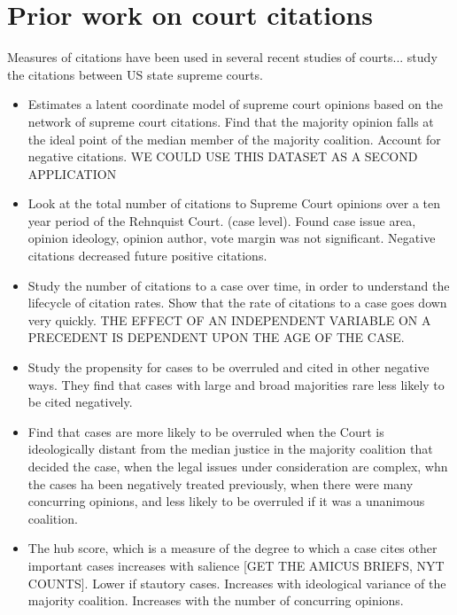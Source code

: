 \documentclass[headsepline=true, abstracton]{scrartcl}
\begin{document}
\section{Prior work on court citations}

Measures of citations have been used in several recent studies of courts...\citet{hinkle2016transmission} study the citations between US state supreme courts.

\begin{itemize}

\item \citet{clark2010locating} Estimates a latent coordinate model of supreme court opinions based on the network of supreme court citations. Find that the majority opinion falls at the ideal point of the median member of the majority coalition. Account for negative citations. WE COULD USE THIS DATASET AS A SECOND APPLICATION

\item \citet{cross2010determinants} Look at the total number of citations to Supreme Court opinions over a ten year period of the Rehnquist Court. (case level).  Found case issue area, opinion ideology, opinion author, vote margin was not significant. Negative citations decreased future positive citations.

\item \citet{black2013citation} Study the number of citations to a case over time, in order to understand the lifecycle of citation rates.  Show that the rate of citations to a case goes down very quickly. THE EFFECT OF AN INDEPENDENT VARIABLE ON A PRECEDENT IS DEPENDENT UPON THE AGE OF THE CASE.

\item \citet{benjamin2012standing} Study the propensity for cases to be overruled and cited in other negative ways. They find that cases with large and broad majorities rare less likely to be cited negatively.

\item \citet{spriggs2001explaining} Find that cases are more likely to be overruled when the Court is ideologically distant from the median justice in the majority coalition that decided the case, when the legal issues under consideration are complex, whn the cases ha been negatively treated previously, when there were many concurring opinions, and less likely to be overruled if it was a unanimous coalition.

\item \citet{lupu2013strategic} The hub score, which is a measure of the degree to which a case cites other important cases increases with salience [GET THE AMICUS BRIEFS, NYT COUNTS]. Lower if stautory cases. Increases with ideological variance of the majority coalition.  Increases with the number of concurring opinions. 

\end{itemize}
\end{document}
